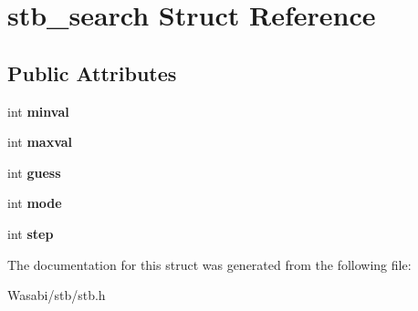 \hypertarget{structstb__search}{}\section{stb\+\_\+search Struct Reference}
\label{structstb__search}
\subsection*{Public Attributes}
\begin{DoxyCompactItemize}
\item 
int {\bfseries minval}\hypertarget{structstb__search_a794d1ad2f6f9b7cf464388a4da64b47b}{}\label{structstb__search_a794d1ad2f6f9b7cf464388a4da64b47b}

\item 
int {\bfseries maxval}\hypertarget{structstb__search_a3f766e480f40bc9c8bb09c1807e0d16a}{}\label{structstb__search_a3f766e480f40bc9c8bb09c1807e0d16a}

\item 
int {\bfseries guess}\hypertarget{structstb__search_a24ccea6383389e0cdd0de201cdb1b732}{}\label{structstb__search_a24ccea6383389e0cdd0de201cdb1b732}

\item 
int {\bfseries mode}\hypertarget{structstb__search_a656a037112af1428e9d760bb1aa76066}{}\label{structstb__search_a656a037112af1428e9d760bb1aa76066}

\item 
int {\bfseries step}\hypertarget{structstb__search_a8f890c99f953c4a2c5c1cf8cfac4a6ab}{}\label{structstb__search_a8f890c99f953c4a2c5c1cf8cfac4a6ab}

\end{DoxyCompactItemize}


The documentation for this struct was generated from the following file\+:\begin{DoxyCompactItemize}
\item 
Wasabi/stb/stb.\+h\end{DoxyCompactItemize}
